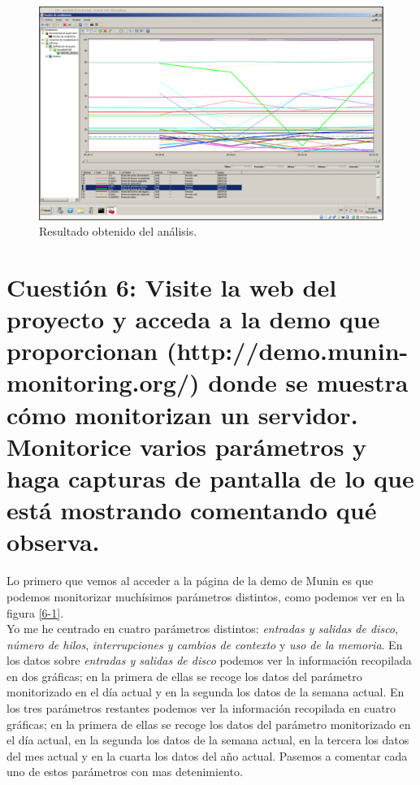 \documentclass[a4paper,titlepage,12pt]{scrartcl}	%
\numberwithin{figure}{section} %
\numberwithin{table}{section} %
\begin{document}
	\begin{figure}[H]
		\centering
		\includegraphics[width=\linewidth]{./Imagenes/5-analisis.png}
		\caption[Resultado obtenido del análisis.]{Resultado obtenido del análisis.}
		\label{5-analisis}
	\end{figure}
	
	\section[Cuestión 6: Visite la web del proyecto y acceda a la demo que proporcionan (http://demo.munin-monitoring.org/) donde se muestra cómo monitorizan un servidor. Monitorice varios parámetros y haga capturas de pantalla de lo que está mostrando comentando qué observa.]{Cuestión 6: Visite la web del proyecto y acceda a la demo que proporcionan (http://demo.munin-monitoring.org/) donde se muestra cómo monitorizan un servidor. Monitorice varios parámetros y haga capturas de pantalla de lo que está mostrando comentando qué observa.}
	
	Lo primero que vemos al acceder a la página de la demo de Munin \cite{munin} es que podemos monitorizar muchísimos parámetros distintos, como podemos ver en la figura \ref{6-1}. \\
	
	Yo me he centrado en cuatro parámetros distintos: \textit{entradas y salidas de disco}, \textit{número de hilos}, \textit{interrupciones y cambios de contexto} y \textit{uso de la memoria}. En los datos sobre \textit{entradas y salidas de disco} podemos ver la información recopilada en dos gráficas; en la primera de ellas se recoge los datos del parámetro monitorizado en el día actual y en la segunda los datos de la semana actual. En los tres parámetros restantes podemos ver la información recopilada en cuatro gráficas; en la primera de ellas se recoge los datos del parámetro monitorizado en el día actual, en la segunda los datos de la semana actual, en la tercera los datos del mes actual y en la cuarta los datos del año actual. Pasemos a comentar cada uno de estos parámetros con mas detenimiento. \\
	
\end{document}
